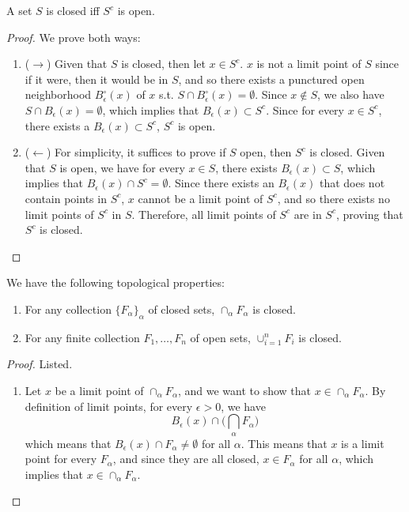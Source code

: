 \documentclass{article}
\begin{document}
    \begin{theorem}
      A set $S$ is closed iff $S^c$ is open. 
    \end{theorem}
    \begin{proof}
      We prove both ways: 
      \begin{enumerate}
        \item ($\rightarrow$) Given that $S$ is closed, then let $x \in S^c$. $x$ is not a limit point of $S$ since if it were, then it would be in $S$, and so there exists a punctured open neighborhood $B_\epsilon^\circ (x)$ of $x$ s.t. $S \cap B_\epsilon^\circ (x) = \emptyset$. Since $x \not\in S$, we also have $S \cap B_\epsilon (x) = \emptyset$, which implies that $B_\epsilon (x) \subset S^c$. Since for every $x \in S^c$, there exists a $B_\epsilon (x) \subset S^c$, $S^c$ is open. 

        \item ($\leftarrow$) For simplicity, it suffices to prove if $S$ open, then $S^c$ is closed. Given that $S$ is open, we have for every $x \in S$, there exists $B_\epsilon (x) \subset S$, which implies that $B_\epsilon (x) \cap S^c = \emptyset$. Since there exists an $B_\epsilon (x)$ that does not contain points in $S^c$, $x$ cannot be a limit point of $S^c$, and so there exists no limit points of $S^c$ in $S$. Therefore, all limit points of $S^c$ are in $S^c$, proving that $S^c$ is closed.  
      \end{enumerate}
    \end{proof}

    \begin{theorem}
    We have the following topological properties: 
    \begin{enumerate}
        \item For any collection $\{F_\alpha\}_\alpha$ of closed sets, $\cap_\alpha F_\alpha$ is closed. 
        \item For any finite collection $F_1, \ldots, F_n$ of open sets, $\cup_{i=1}^n F_i$ is closed. 
    \end{enumerate}
    \end{theorem}
    \begin{proof}
    Listed. 
    \begin{enumerate}
        \item Let $x$ be a limit point of $\cap_\alpha F_\alpha$, and we want to show that $x \in \cap_\alpha F_\alpha$. By definition of limit points, for every $\epsilon > 0$, we have 
        \[B_\epsilon (x) \cap \bigg( \bigcap_\alpha F_\alpha \bigg) \]
        which means that $B_\epsilon (x) \cap F_\alpha \neq \emptyset$ for all $\alpha$. This means that $x$ is a limit point for every $F_\alpha$, and since they are all closed, $x \in F_\alpha$ for all $\alpha$, which implies that $x \in \cap_\alpha F_\alpha$. 
    \end{enumerate}
    \end{proof}
\end{document}
